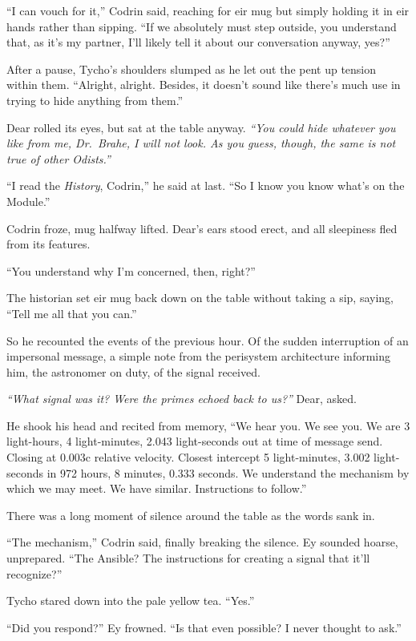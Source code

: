 ``I can vouch for it,'' Codrin said, reaching for eir mug but simply holding it in eir hands rather than sipping. ``If we absolutely must step outside, you understand that, as it's my partner, I'll likely tell it about our conversation anyway, yes?''

After a pause, Tycho's shoulders slumped as he let out the pent up tension within them. ``Alright, alright. Besides, it doesn't sound like there's much use in trying to hide anything from them.''

Dear rolled its eyes, but sat at the table anyway. \emph{``You could hide whatever you like from me, Dr.~Brahe, I will not look. As you guess, though, the same is not true of other Odists.''}

``I read the \emph{History}, Codrin,'' he said at last. ``So I know you know what's on the Module.''

Codrin froze, mug halfway lifted. Dear's ears stood erect, and all sleepiness fled from its features.

``You understand why I'm concerned, then, right?''

The historian set eir mug back down on the table without taking a sip, saying, ``Tell me all that you can.''

So he recounted the events of the previous hour. Of the sudden interruption of an impersonal message, a simple note from the perisystem architecture informing him, the astronomer on duty, of the signal received.

\emph{``What signal was it? Were the primes echoed back to us?''} Dear, asked.

He shook his head and recited from memory, ``We hear you. We see you. We are 3 light-hours, 4 light-minutes, 2.043 light-seconds out at time of message send. Closing at 0.003c relative velocity. Closest intercept 5 light-minutes, 3.002 light-seconds in 972 hours, 8 minutes, 0.333 seconds. We understand the mechanism by which we may meet. We have similar. Instructions to follow.''

There was a long moment of silence around the table as the words sank in.

``The mechanism,'' Codrin said, finally breaking the silence. Ey sounded hoarse, unprepared. ``The Ansible? The instructions for creating a signal that it'll recognize?''

Tycho stared down into the pale yellow tea. ``Yes.''

``Did you respond?'' Ey frowned. ``Is that even possible? I never thought to ask.''

